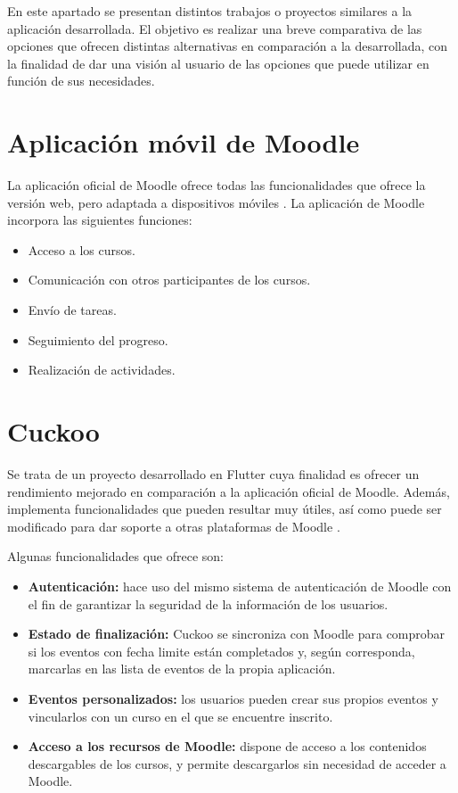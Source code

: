 
En este apartado se presentan distintos trabajos o proyectos similares a la aplicación desarrollada. El objetivo es realizar una breve comparativa de las opciones que ofrecen distintas alternativas en comparación a la desarrollada, con la finalidad de dar una visión al usuario de las opciones que puede utilizar en función de sus necesidades.

\section{Aplicación móvil de Moodle}
La aplicación oficial de Moodle ofrece todas las funcionalidades que ofrece la versión web, pero adaptada a dispositivos móviles \cite{related_moodle}. La aplicación de Moodle incorpora las siguientes funciones:
\begin{itemize}
    \item Acceso a los cursos.
    \item Comunicación con otros participantes de los cursos.
    \item Envío de tareas.
    \item Seguimiento del progreso.
    \item Realización de actividades.
\end{itemize}

\section{Cuckoo}
Se trata de un proyecto desarrollado en Flutter cuya finalidad es ofrecer un rendimiento mejorado en comparación a la aplicación oficial de Moodle. Además, implementa funcionalidades que pueden resultar muy útiles, así como puede ser modificado para dar soporte a otras plataformas de Moodle \cite{related_cuckoo}.

Algunas funcionalidades que ofrece son:
\begin{itemize}
    \item \textbf{Autenticación:} hace uso del mismo sistema de autenticación de Moodle con el fin de garantizar la seguridad de la información de los usuarios.
    \item \textbf{Estado de finalización:} Cuckoo se sincroniza con Moodle para comprobar si los eventos con fecha limite están completados y, según corresponda, marcarlas en las lista de eventos de la propia aplicación.
    \item \textbf{Eventos personalizados:} los usuarios pueden crear sus propios eventos y vincularlos con un curso en el que se encuentre inscrito.
    \item \textbf{Acceso a los recursos de Moodle:} dispone de acceso a los contenidos descargables de los cursos, y permite descargarlos sin necesidad de acceder a Moodle.
\end{itemize}

